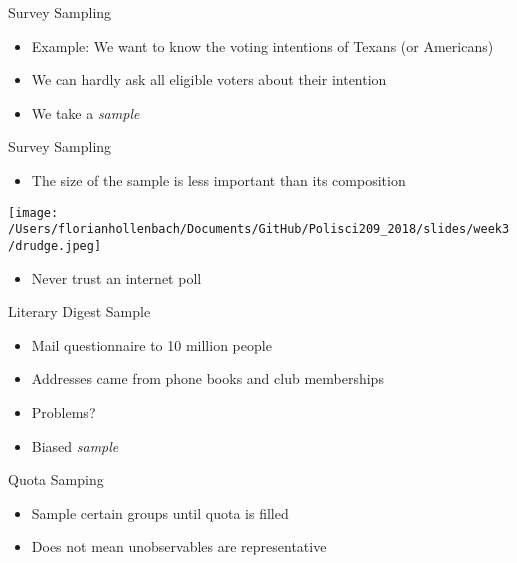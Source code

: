 \documentclass[presentation]{beamer}
\begin{document}
\begin{frame}[label={sec:org87e90ac}]{Survey Sampling}
\begin{itemize}
\item Example: We want to know the voting intentions of Texans (or Americans)
\item We can hardly ask all eligible voters about their intention
\end{itemize}

\pause
\begin{itemize}
\item We take a \emph{sample}
\end{itemize}
\end{frame}

\begin{frame}[label={sec:org9a96577}]{Survey Sampling}
\begin{itemize}
\item The size of the sample is less important than its composition
\end{itemize}

\begin{center}
\texttt{[image: /Users/florianhollenbach/Documents/GitHub/Polisci209\_2018/slides/week3/drudge.jpeg]}
\end{center}

\begin{itemize}
\item Never trust an internet poll
\end{itemize}
\end{frame}

\begin{frame}[label={sec:org2e6b4fe}]{Literary Digest Sample}
\begin{itemize}
\item Mail questionnaire to 10 million people

\item Addresses came from phone books and club memberships

\item Problems?
\end{itemize}

\pause

\begin{itemize}
\item Biased \emph{sample}
\end{itemize}
\end{frame}


\begin{frame}[label={sec:org47e3b43}]{Quota Samping}
\begin{itemize}
\item Sample certain groups until quota is filled

\item Does not mean unobservables are representative
\end{itemize}
\end{frame}
\end{document}
